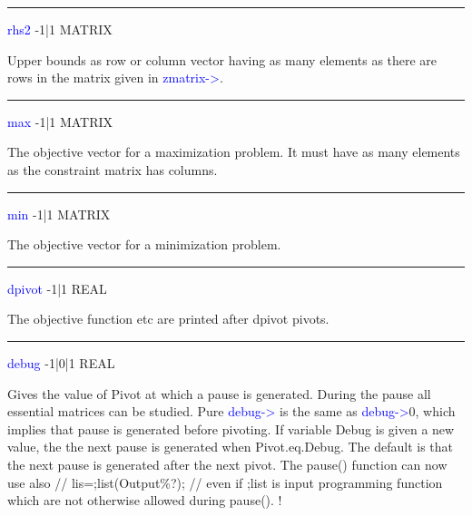 \hrule
\vspace{0.3cm}
\noindent \textcolor{blue}{rhs2}  \tabto{3cm} -1|1 \tabto{5cm}  MATRIX \tabto{7cm}
\begin{changemargin}{3cm}{0cm}
\noindent  Upper bounds as row or column vector having as many elements as there are
rows  in the matrix given in \textcolor{blue}{zmatrix->}.
\end{changemargin}
\vspace{0.3cm}
\hrule
\vspace{0.3cm}
\noindent \textcolor{blue}{max} \tabto{3cm} -1|1 \tabto{5cm}  MATRIX \tabto{7cm}
\begin{changemargin}{3cm}{0cm}
\noindent  The objective vector for a maximization problem. It must have as many elements as the
constraint matrix has columns.
\end{changemargin}
\vspace{0.3cm}
\hrule
\vspace{0.3cm}
\noindent \textcolor{blue}{min} \tabto{3cm} -1|1 \tabto{5cm}  MATRIX \tabto{7cm}
\begin{changemargin}{3cm}{0cm}
\noindent  The objective vector for a minimization problem.
\end{changemargin}
\vspace{0.3cm}
\hrule
\vspace{0.3cm}
\noindent \textcolor{blue}{dpivot} \tabto{3cm} -1|1 \tabto{5cm}  REAL \tabto{7cm}
\begin{changemargin}{3cm}{0cm}
\noindent  The objective function etc are printed after  dpivot pivots.
\end{changemargin}
\vspace{0.3cm}
\hrule
\vspace{0.3cm}
\noindent \textcolor{blue}{debug} \tabto{3cm} -1|0|1 \tabto{5cm}  REAL \tabto{7cm}
\begin{changemargin}{3cm}{0cm}
\noindent  Gives the value of Pivot at which a pause is generated. During the pause all essential
matrices can be studied. Pure \textcolor{blue}{debug->} is the same as \textcolor{blue}{debug->}0, which implies that pause is generated before
pivoting. If variable Debug is given a new value, the the next pause is generated when Pivot.eq.Debug. The default is that
the next pause is generated after the next pivot. The \textcolor{VioletRed}{pause}() function can now use also //
lis=;list(Output\%?); //
even if ;list is input programming function which are not otherwise allowed during \textcolor{VioletRed}{pause}().
	!
\end {changemargin}
